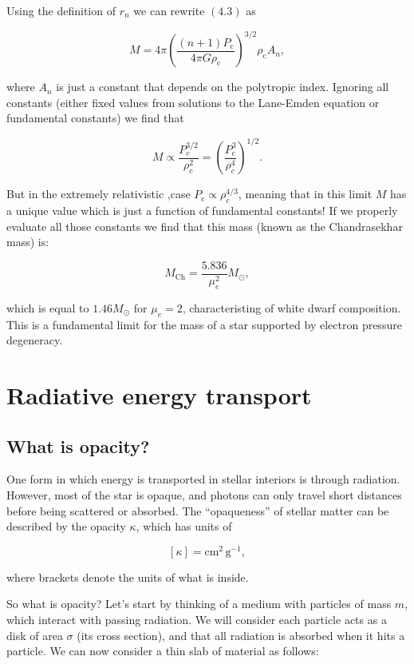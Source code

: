 \documentclass[twocolumn]{article}
\begin{document}
Using the definition of \(r_n\) we can rewrite \((4.3)\) as

\[M=4\pi \left(\frac{(n+1)P_\mathrm{c}}{4\pi G \rho_\mathrm{c}}\right)^{3/2}\rho_\mathrm{c}A_n,\]

where \(A_n\) is just a constant that depends on the polytropic index.
Ignoring all constants (either fixed values from solutions to the
Lane-Emden equation or fundamental constants) we find that

\[M\propto \frac{P_c^{3/2}}{\rho_c^2}=\left(\frac{P_\mathrm{c}^3}{\rho_c^4}\right)^{1/2}.\]

But in the extremely relativistic ,case
\(P_\mathrm{c}\propto \rho_c^{4/3}\), meaning that in this limit \(M\)
has a unique value which is just a function of fundamental constants! If
we properly evaluate all those constants we find that this mass (known
as the Chandrasekhar mass) is:

\[M_\mathrm{Ch}=\frac{5.836}{\mu_e^2}M_\odot,\]

which is equal to \(1.46M_\odot\) for \(\mu_e=2\), characteristing of
white dwarf composition. This is a fundamental limit for the mass of a
star supported by electron pressure degeneracy.

\hypertarget{radiative-energy-transport}{%
\section{Radiative energy transport}\label{radiative-energy-transport}}


\hypertarget{what-is-opacity}{%
\subsection{What is opacity?}\label{what-is-opacity}}

One form in which energy is transported in stellar interiors is through
radiation. However, most of the star is opaque, and photons can only
travel short distances before being scattered or absorbed. The
``opaqueness'' of stellar matter can be described by the opacity
\(\kappa\), which has units of

\[[\kappa]=\mathrm{cm^{2}\,g^{-1}},\]

where brackets denote the units of what is inside.

So what is opacity? Let's start by thinking of a medium with particles
of mass \(m\), which interact with passing radiation. We will consider
each particle acts as a disk of area \(\sigma\) (its cross section), and
that all radiation is absorbed when it hits a particle. We can now
consider a thin slab of material as follows:
\end{document}
